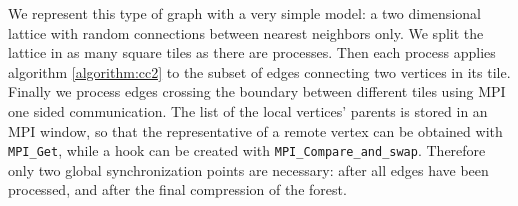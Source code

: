 We represent this type of graph with a very simple model: a two dimensional lattice with random
connections between nearest neighbors
only. We split the lattice in as many square tiles as there are processes. Then each process
applies algorithm \ref{algorithm:cc2} to the subset
of edges connecting two vertices in its tile. Finally we process
edges crossing the boundary between different tiles using MPI one sided communication. The list
of the local vertices' parents is stored in an MPI window, so that
the representative of a remote vertex
can be obtained with \verb|MPI_Get|, while a hook can be created with \verb|MPI_Compare_and_swap|.
Therefore only two global synchronization points are necessary: after all edges have been
processed, and after the final compression
of the forest.





